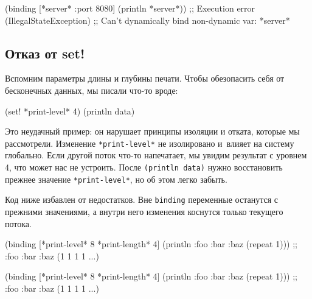 \else

\begin{english}
  \begin{clojure}
(binding [*server* {:port 8080}]
  (println *server*))
;; Execution error (IllegalStateException)
;; Can't dynamically bind non-dynamic var: *server*
  \end{clojure}
\end{english}

\fi

\subsection{Отказ от set!}

Вспомним параметры длины и глубины печати. Чтобы обезопасить себя от бесконечных
данных, мы писали что-то вроде:

\begin{english}
  \begin{clojure}
(set! *print-level* 4)
(println data)
  \end{clojure}
\end{english}


Это неудачный пример: он нарушает принципы изоляции и отката, которые мы
рассмотрели. Изменение \verb|*print-level*| не изолировано и~влияет на систему
глобально. Если другой поток что-то напечатает, мы увидим результат с уровнем 4,
что может нас не устроить. После \verb|(println data)| нужно восстановить
прежнее значение \verb|*print-level*|, но об этом легко забыть.

Код ниже избавлен от недостатков. Вне \texttt{bin\-ding} переменные останутся с
прежними значениями, а внутри него изменения коснутся только текущего потока.

\ifnarrow

\begin{english}
  \begin{clojure}
(binding [*print-level* 8
          *print-length* 4]
  (println
    {:foo {:bar {:baz (repeat 1)}}}))
;; {:foo {:bar {:baz (1 1 1 1 ...)}}}
  \end{clojure}
\end{english}

\else

\begin{english}
  \begin{clojure}
(binding [*print-level* 8
          *print-length* 4]
  (println {:foo {:bar {:baz (repeat 1)}}}))
;; {:foo {:bar {:baz (1 1 1 1 ...)}}}
  \end{clojure}
\end{english}

